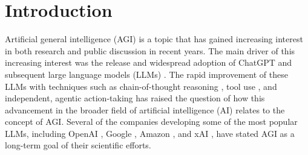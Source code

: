 \section{Introduction}\label{sec:introduction}

Artificial general intelligence (AGI) is a topic that has gained increasing interest in both research and public discussion in recent years.
The main driver of this increasing interest was the release and widespread adoption of ChatGPT and subsequent large language models (LLMs) \citep{brown_language_2020}.
The rapid improvement of these LLMs with techniques such as chain-of-thought reasoning \citep{wei_chain--thought_2022}, tool use \citep{schick_toolformer_2023}, and independent, agentic action-taking has raised the question of how this advancement in the broader field of artificial intelligence (AI) relates to the concept of AGI.
Several of the companies developing some of the most popular LLMs, including OpenAI \citep{openai_planning_2024}, Google \citep{legg_taking_2025}, Amazon \citep{link_amazon_2024}, and xAI \citep{kay_inside_nodate}, have stated AGI as a long-term goal of their scientific efforts.\\


